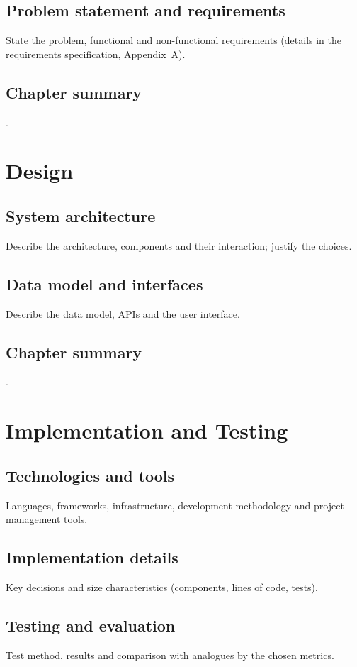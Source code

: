 \documentclass[12pt,a4paper]{extreport}
\begin{document}
\section{Problem statement and requirements}
State the problem, functional and non-functional requirements (details in
the requirements specification, Appendix~A).

\section{Chapter summary}
.

\clearpage
\chapter{Design}
\section{System architecture}
Describe the architecture, components and their interaction; justify the choices.

\section{Data model and interfaces}
Describe the data model, APIs and the user interface.

\section{Chapter summary}
.

\clearpage
\chapter{Implementation and Testing}
\section{Technologies and tools}
Languages, frameworks, infrastructure, development methodology and project
management tools.

\section{Implementation details}
Key decisions and size characteristics (components, lines of code, tests).

\section{Testing and evaluation}
Test method, results and comparison with analogues by the chosen metrics.
\end{document}
